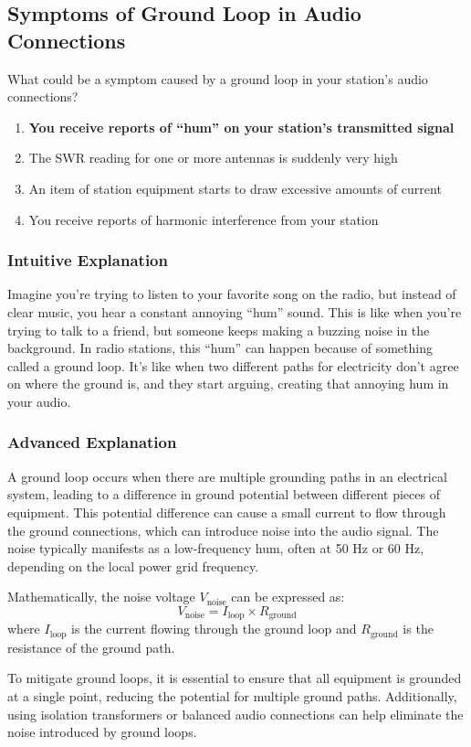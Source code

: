 \subsection{Symptoms of Ground Loop in Audio Connections}
\label{G4C10}

\begin{tcolorbox}[colback=gray!10!white,colframe=black!75!black,title=G4C10]
What could be a symptom caused by a ground loop in your station’s audio connections?
\begin{enumerate}[label=\Alph*)]
    \item \textbf{You receive reports of “hum” on your station’s transmitted signal}
    \item The SWR reading for one or more antennas is suddenly very high
    \item An item of station equipment starts to draw excessive amounts of current
    \item You receive reports of harmonic interference from your station
\end{enumerate}
\end{tcolorbox}

\subsubsection{Intuitive Explanation}
Imagine you’re trying to listen to your favorite song on the radio, but instead of clear music, you hear a constant annoying “hum” sound. This is like when you’re trying to talk to a friend, but someone keeps making a buzzing noise in the background. In radio stations, this “hum” can happen because of something called a ground loop. It’s like when two different paths for electricity don’t agree on where the ground is, and they start arguing, creating that annoying hum in your audio.

\subsubsection{Advanced Explanation}
A ground loop occurs when there are multiple grounding paths in an electrical system, leading to a difference in ground potential between different pieces of equipment. This potential difference can cause a small current to flow through the ground connections, which can introduce noise into the audio signal. The noise typically manifests as a low-frequency hum, often at 50 Hz or 60 Hz, depending on the local power grid frequency.

Mathematically, the noise voltage \( V_{\text{noise}} \) can be expressed as:
\[ V_{\text{noise}} = I_{\text{loop}} \times R_{\text{ground}} \]
where \( I_{\text{loop}} \) is the current flowing through the ground loop and \( R_{\text{ground}} \) is the resistance of the ground path.

To mitigate ground loops, it is essential to ensure that all equipment is grounded at a single point, reducing the potential for multiple ground paths. Additionally, using isolation transformers or balanced audio connections can help eliminate the noise introduced by ground loops.

